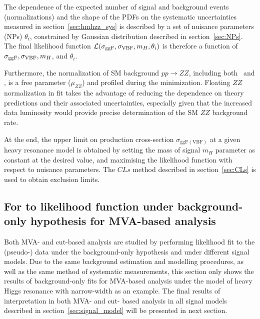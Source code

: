 The dependence of the expected number of signal and background events (normalizations) and the shape of the PDFs on the systematic uncertainties measured in section~\ref{sec:hmhzz_sys} 
is described by a set of nuisance parameters (NPs) $\theta_{i}$, constrained by Gaussian distribution described in section~\ref{sec:NPs}.
The final likelihood function ${\cal L } ( \sigma_{\mathrm{ggF}}, \sigma_{\mathrm{VBF}},m_{H},\theta_{i})$ is therefore a function of $\sigma_{\mathrm{ggF}}, \sigma_{\mathrm{VBF}} , m_{H}$, and $\theta_{i}$.

Furthermore, the normalization of SM background $pp\to ZZ$, including both \qqZZ\ and \ggZZ, is a free parameter ($\mu_{ZZ}$) and profiled during the minimization.
Floating $ZZ$ normalization in fit takes the advantage of reducing the dependence on theory predictions and their associated uncertainties,
especially given that the increased data luminosity would provide precise determination of the SM $ZZ$ background rate.

At the end, the upper limit on production cross-section $\sigma_{\mathrm{ggF(VBF)}}$ at a given heavy resonance model is obtained by setting the mass of signal $m_{H}$ parameter as constant at the desired value,
and maximising the likelihood function with respect to nuisance parameters.
The $CLs$ method described in section~\ref{sec:CLs} is used to obtain exclusion limits.

\subsection{For to likelihood function under background-only hypothesis for MVA-based analysis}

Both MVA- and cut-based analysis are studied by performing likelihood fit to the (pseudo-) data under the background-only hypothesis and under different signal models.
Due to the same background estimation and modelling procedures, as well as the same method of systematic measurements,
this section only shows the results of background-only fits for MVA-based analysis under the model of heavy Higgs resonance with narrow-width as an example.
The final results of interpretation in both MVA- and cut- based analysis in all signal models described in section~\ref{sec:signal_model} will be presented in next section.

